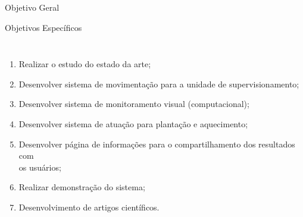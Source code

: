\begin{frame}[c]{Objetivo Geral} 
    \transdissolve[duration=0.5]
   
    \begin{center}
    \end{center}
    
   
\end{frame}
\begin{frame}[t]{Objetivos Específicos}
    \transboxout[duration=0.5]
    \begin{columns}
            \begin{enumerate}
                \item Realizar o estudo do estado da arte;
                \item Desenvolver sistema de movimentação para a unidade de supervisionamento;
                \item Desenvolver sistema de monitoramento visual (computacional);
                \item Desenvolver sistema de atuação para plantação e aquecimento;
                \item Desenvolver página de informações para o compartilhamento dos resultados com 
                \\ os usuários;
                \item Realizar demonstração do sistema;
                \item Desenvolvimento de artigos científicos.

            \end{enumerate}
    \end{columns}
\end{frame}

